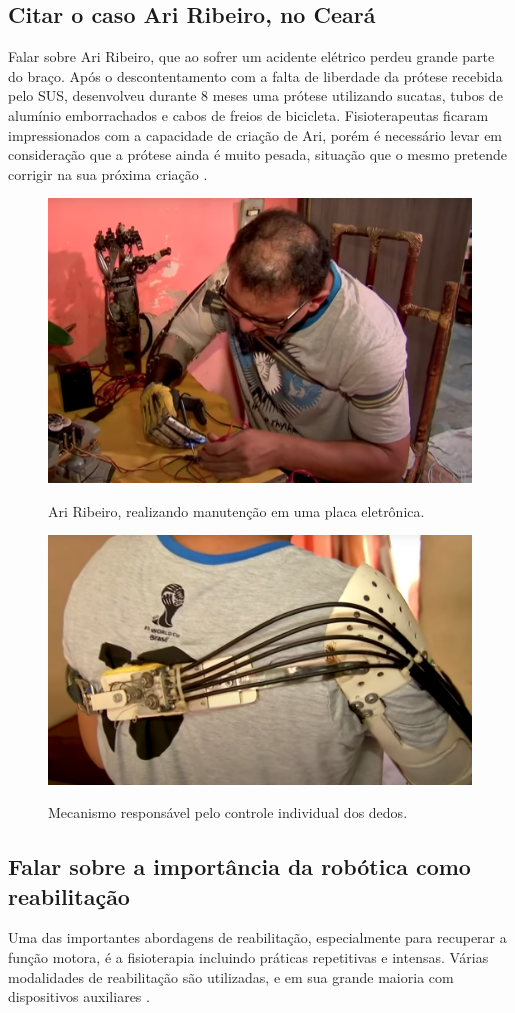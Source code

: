 \documentclass[12pt,a4paper]{article}
\begin{document}
    \subsection{Citar o caso Ari Ribeiro, no Ceará}
    Falar sobre Ari Ribeiro, que ao sofrer um acidente elétrico perdeu grande parte do braço. Após o descontentamento com a falta de liberdade da prótese recebida pelo SUS, desenvolveu durante 8 meses uma prótese utilizando sucatas, tubos de alumínio emborrachados e cabos de freios de bicicleta. Fisioterapeutas ficaram impressionados com a capacidade de criação de Ari, porém é necessário levar em consideração que a prótese ainda é muito pesada, situação que o mesmo pretende corrigir na sua próxima criação \cite{7}. 
    \begin{figure}[ht]
        \caption{Ari Ribeiro, realizando manutenção em uma placa eletrônica. \cite{7}}
        \centering
        \includegraphics[width=0.6\linewidth]
        {images/ariribeiro.png}
        \label{fig:les}
    \end{figure}
    \begin{figure}[ht]
        \caption{Mecanismo responsável pelo controle individual dos dedos. \cite{7}}
        \centering
        \includegraphics[width=0.6\linewidth]
        {images/ariribeiro2.png}
        \label{fig:les}
    \end{figure}

    \subsection{Falar sobre a importância da robótica como reabilitação}
    Uma das importantes abordagens de reabilitação, especialmente para recuperar a função motora, é a fisioterapia incluindo práticas repetitivas e intensas. Várias modalidades de reabilitação são utilizadas, e em sua grande maioria com dispositivos auxiliares \cite{2}.
\end{document}

